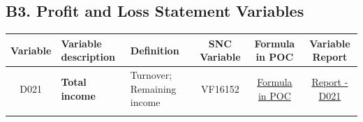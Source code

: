 \documentclass[]{book}
\begin{document}
\hypertarget{b3.-profit-and-loss-statement-variables}{%
\subsection{B3. Profit and Loss Statement Variables}\label{b3.-profit-and-loss-statement-variables}}

\begin{longtable}[]{@{}cllccc@{}}
\toprule
\begin{minipage}[b]{0.08\columnwidth}\centering
Variable\strut
\end{minipage} & \begin{minipage}[b]{0.20\columnwidth}\raggedright
Variable description\strut
\end{minipage} & \begin{minipage}[b]{0.16\columnwidth}\raggedright
Definition\strut
\end{minipage} & \begin{minipage}[b]{0.09\columnwidth}\centering
SNC Variable\strut
\end{minipage} & \begin{minipage}[b]{0.15\columnwidth}\centering
Formula in POC\strut
\end{minipage} & \begin{minipage}[b]{0.16\columnwidth}\centering
Variable Report\strut
\end{minipage}\tabularnewline
\midrule
\endhead
\begin{minipage}[t]{0.08\columnwidth}\centering
D021\strut
\end{minipage} & \begin{minipage}[t]{0.20\columnwidth}\raggedright
\textbf{Total income}\strut
\end{minipage} & \begin{minipage}[t]{0.16\columnwidth}\raggedright
Turnover; Remaining income\strut
\end{minipage} & \begin{minipage}[t]{0.09\columnwidth}\centering
VF16152\strut
\end{minipage} & \begin{minipage}[t]{0.15\columnwidth}\centering
\protect\hyperlink{d021---formula-in-poc}{Formula in POC}\strut
\end{minipage} & \begin{minipage}[t]{0.16\columnwidth}\centering
\href{./Auxiliary\%20Files/technical_reports/variable_report/D021(!).pdf}{Report - D021}\strut
\end{minipage}\tabularnewline
\begin{minipage}[t]{0.08\columnwidth}\centering

\end{minipage}
\end{longtable}
\end{document}
